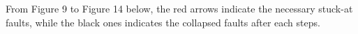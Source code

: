 From Figure 9 to Figure 14 below, the red arrows indicate the necessary stuck-at faults, while the black ones indicates the collapsed faults after each steps.







